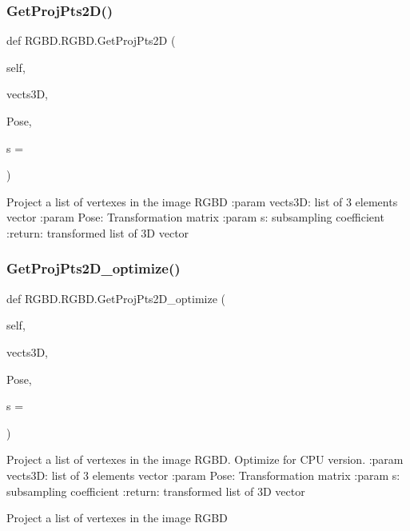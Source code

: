 \subsubsection{\texorpdfstring{Get\+Proj\+Pts2\+D()}{GetProjPts2D()}}
{\footnotesize\ttfamily def R\+G\+B\+D.\+R\+G\+B\+D.\+Get\+Proj\+Pts2D (\begin{DoxyParamCaption}\item[{}]{self,  }\item[{}]{vects3D,  }\item[{}]{Pose,  }\item[{}]{s = {} }\end{DoxyParamCaption})}

\begin{DoxyVerb}Project a list of vertexes in the image RGBD
:param vects3D: list of 3 elements vector
:param Pose: Transformation matrix
:param s: subsampling coefficient
:return: transformed list of 3D vector
\end{DoxyVerb}
 \mbox{\label{class_r_g_b_d_1_1_r_g_b_d_a9213368288cc80787b00a71927fc2ad1}} 
\subsubsection{\texorpdfstring{Get\+Proj\+Pts2\+D\+\_\+optimize()}{GetProjPts2D\_optimize()}}
{\footnotesize\ttfamily def R\+G\+B\+D.\+R\+G\+B\+D.\+Get\+Proj\+Pts2\+D\+\_\+optimize (\begin{DoxyParamCaption}\item[{}]{self,  }\item[{}]{vects3D,  }\item[{}]{Pose,  }\item[{}]{s = {} }\end{DoxyParamCaption})}

\begin{DoxyVerb}Project a list of vertexes in the image RGBD. Optimize for CPU version.
:param vects3D: list of 3 elements vector
:param Pose: Transformation matrix
:param s: subsampling coefficient
:return: transformed list of 3D vector
\end{DoxyVerb}
\begin{DoxyVerb}Project a list of vertexes in the image RGBD\end{DoxyVerb}
 \mbox{\label{class_r_g_b_d_1_1_r_g_b_d_accb9314bc9a43859adbcbb85283e3722}} 
